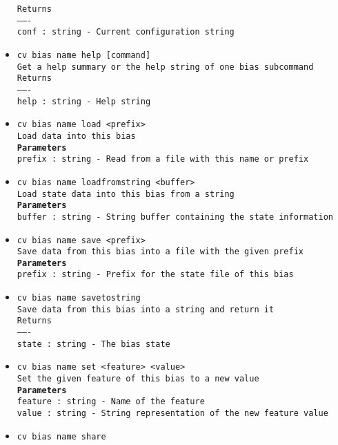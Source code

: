 \begin{itemize}
\texttt{Returns}
\\
\texttt{-------}
\\
\texttt{conf : string - Current configuration string}
\item \texttt{cv bias name help [command]}
\\
\texttt{Get a help summary or the help string of one bias subcommand}
\\
\texttt{Returns}
\\
\texttt{-------}
\\
\texttt{help : string - Help string}
\item \texttt{cv bias name load <prefix>}
\\
\texttt{Load data into this bias}
\\
\texttt{\textbf{Parameters}}
\\
\texttt{prefix : string - Read from a file with this name or prefix}
\item \texttt{cv bias name loadfromstring <buffer>}
\\
\texttt{Load state data into this bias from a string}
\\
\texttt{\textbf{Parameters}}
\\
\texttt{buffer : string - String buffer containing the state information}
\item \texttt{cv bias name save <prefix>}
\\
\texttt{Save data from this bias into a file with the given prefix}
\\
\texttt{\textbf{Parameters}}
\\
\texttt{prefix : string - Prefix for the state file of this bias}
\item \texttt{cv bias name savetostring}
\\
\texttt{Save data from this bias into a string and return it}
\\
\texttt{Returns}
\\
\texttt{-------}
\\
\texttt{state : string - The bias state}
\item \texttt{cv bias name set <feature> <value>}
\\
\texttt{Set the given feature of this bias to a new value}
\\
\texttt{\textbf{Parameters}}
\\
\texttt{feature : string - Name of the feature}
\\
\texttt{value : string - String representation of the new feature value}
\item \texttt{cv bias name share}

\end{itemize}
